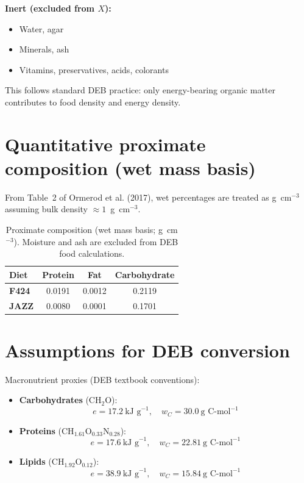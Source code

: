 \documentclass[11pt]{article}
\begin{document}
\textbf{Inert (excluded from $X$):}
\begin{itemize}
  \item Water, agar
  \item Minerals, ash
  \item Vitamins, preservatives, acids, colorants
\end{itemize}

This follows standard DEB practice: only energy-bearing organic matter contributes to food density and energy density.

\section{Quantitative proximate composition (wet mass basis)}

From Table~2 of Ormerod et al. (2017), wet percentages are treated as g~cm$^{-3}$ assuming bulk density $\approx 1$~g~cm$^{-3}$.

\begin{table}[h]
  \centering
  \begin{tabular}{lS[table-format=1.4]S[table-format=1.4]S[table-format=1.4]}
    \toprule
    Diet & {Protein} & {Fat} & {Carbohydrate} \\
    \midrule
    \textbf{F424} & 0.0191 & 0.0012 & 0.2119 \\
    \textbf{JAZZ} & 0.0080 & 0.0001 & 0.1701 \\
    \bottomrule
  \end{tabular}
  \caption{Proximate composition (wet mass basis; g~cm$^{-3}$). Moisture and ash are excluded from DEB food calculations.}
\end{table}

\section{Assumptions for DEB conversion}

Macronutrient proxies (DEB textbook conventions):

\begin{itemize}
  \item \textbf{Carbohydrates} (CH$_2$O):
  \[
    e = 17.2\ \text{kJ g}^{-1}, \quad w_C = 30.0\ \text{g C-mol}^{-1}
  \]

  \item \textbf{Proteins} (CH$_{1.61}$O$_{0.33}$N$_{0.28}$):
  \[
    e = 17.6\ \text{kJ g}^{-1}, \quad w_C = 22.81\ \text{g C-mol}^{-1}
  \]

  \item \textbf{Lipids} (CH$_{1.92}$O$_{0.12}$):
  \[
    e = 38.9\ \text{kJ g}^{-1}, \quad w_C = 15.84\ \text{g C-mol}^{-1}
  \]
\end{itemize}
\end{document}
